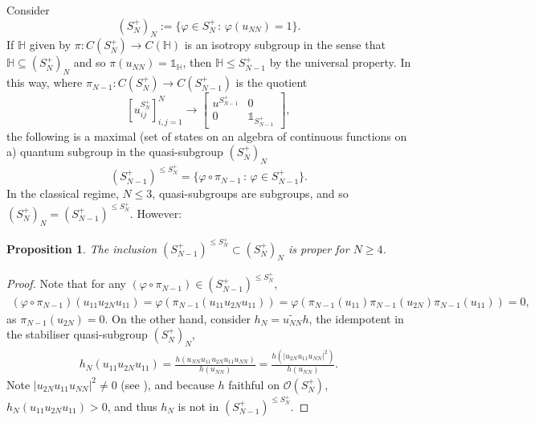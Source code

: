 \documentclass[12pt]{amsart}
\newtheorem{proposition}[theorem]{Proposition}
\theoremstyle{remark}
\theoremstyle{remark}
\begin{document}
Consider
$$(S_{N}^+)_N:=\{\varphi\in S_N^+\,\colon\,\varphi(u_{NN})=1\}.$$
If $\mathbb{H}$ given by $\pi:C(S_{N}^+)\to C(\mathbb{H})$ is an isotropy subgroup in the sense that $\mathbb{H}\subseteq (S_{N}^+)_N$ and so $\pi(u_{NN})=\mathds{1}_{\mathbb{H}}$, then $\mathbb{H}\leq S_{N-1}^+$ by the universal property. In this way, where $\pi_{N-1}:C(S_N^+)\to C(S_{N-1}^+)$ is the quotient
$$[u_{ij}^{S_N^+}]_{i,j=1}^N\to \begin{bmatrix}
                                  u^{S_{N-1}^+} & 0 \\
                                  0 & \mathds{1}_{S_{N-1}^+}
                                \end{bmatrix},$$
the following is a maximal (set of states on an algebra of continuous functions on a) quantum subgroup in the quasi-subgroup  $(S_{N}^+)_N$
$$(S_{N-1}^+)^{\leq S_N^+}=\{\varphi\circ \pi_{N-1}\,\colon\,\varphi\in S_{N-1}^+\}.$$
In the classical regime, $N\leq 3$, quasi-subgroups are subgroups, and so $(S_{N}^+)_N=(S_{N-1}^+)^{\leq S_N^+}$. However:
\begin{proposition}
The inclusion $(S_{N-1}^+)^{\leq S_N^+}\subset (S_{N}^+)_N$ is proper for $N\geq 4$.
\end{proposition}
\begin{proof}
Note that for any $(\varphi\circ \pi_{N-1})\in (S_{N-1}^+)^{\leq S_N^+}$,
\begin{align*}
  (\varphi\circ \pi_{N-1})(u_{11}u_{2N}u_{11})  =\varphi(\pi_{N-1}(u_{11}u_{2N}u_{11}))=\varphi(\pi_{N-1}(u_{11})\pi_{N-1}(u_{2N})\pi_{N-1}(u_{11}))=0,
\end{align*}
as $\pi_{N-1}(u_{2N})=0$. On the other hand, consider $h_N=\widetilde{u_{NN}}h$, the idempotent in the stabiliser quasi-subgroup $(S_N^+)_N$,
\begin{align*}
  h_N(u_{11}u_{2N}u_{11}) =\frac{h(u_{NN}u_{11}u_{2N}u_{11}u_{NN})}{h(u_{NN})}= \frac{h(|u_{2N}u_{11}u_{NN}|^2)}{h(u_{NN})}.
\end{align*}
Note $|u_{2N}u_{11}u_{NN}|^2\neq 0$ (see \cite{mc2}), and  because $h$ faithful on $\mathcal{O}(S_N^+)$, $h_N(u_{11}u_{2N}u_{11})>0$, and thus $h_N$ is not in $(S_{N-1}^+)^{\leq S_N^+}$.

\end{proof}
\end{document}
